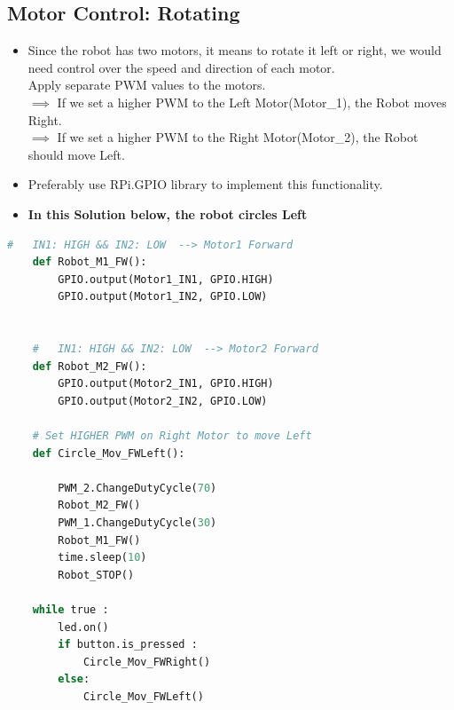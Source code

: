 

\subsection*{\Large Motor Control: Rotating }
    \begin{itemize}
        \item  Since the robot has two motors, it means to rotate it left or right, we would need control over the speed and direction of each motor.\\
        Apply separate PWM values to the motors.\\ 
        $\implies$ If we set a higher PWM to the Left Motor(Motor\_1), the Robot moves Right.\\
        $\implies$ If we set a higher PWM to the Right Motor(Motor\_2), the Robot should move Left.\\
        \item Preferably use RPi.GPIO library to implement this functionality.
        \item \textbf{In this Solution  below, the robot circles Left }
        \end{itemize}

    \begin{lstlisting}[language=Python]
    #   IN1: HIGH && IN2: LOW  --> Motor1 Forward
    def Robot_M1_FW():
        GPIO.output(Motor1_IN1, GPIO.HIGH)
        GPIO.output(Motor1_IN2, GPIO.LOW)


    #   IN1: HIGH && IN2: LOW  --> Motor2 Forward
    def Robot_M2_FW():
        GPIO.output(Motor2_IN1, GPIO.HIGH)
        GPIO.output(Motor2_IN2, GPIO.LOW)
    
    # Set HIGHER PWM on Right Motor to move Left
    def Circle_Mov_FWLeft():
    
        PWM_2.ChangeDutyCycle(70)
        Robot_M2_FW()
        PWM_1.ChangeDutyCycle(30)
        Robot_M1_FW()
        time.sleep(10)
        Robot_STOP()
        
    while true :
        led.on()
        if button.is_pressed :
            Circle_Mov_FWRight()
        else:
            Circle_Mov_FWLeft()
        \end{lstlisting}
    
\newpage
